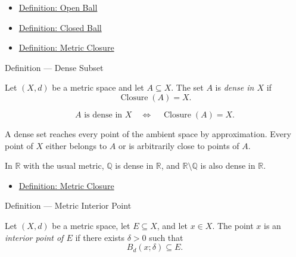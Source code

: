 \begin{dependencies}
\begin{itemize}
  \item \hyperref[def:metric-open-ball]{Definition: Open Ball}
  \item \hyperref[def:metric-closed-ball]{Definition: Closed Ball}
  \item \hyperref[def:metric-closure]{Definition: Metric Closure}
\end{itemize}
\end{dependencies}

\begin{definitionbox}{Definition --- Dense Subset}
\begin{definition}\label{def:metric-dense-subset}
Let \((X,d)\) be a metric space and let \(A\subseteq X\).  The set \(A\) is
\emph{dense in \(X\)} if
\[
  \operatorname{Closure}(A)=X.
\]
\end{definition}
\end{definitionbox}

\begin{remark*}
\[
A\text{ is dense in }X
\quad\Longleftrightarrow\quad
\operatorname{Closure}(A)=X.
\]
\end{remark*}

\begin{remark*}[Interpretation]
A dense set reaches every point of the ambient space by approximation.  Every
point of \(X\) either belongs to \(A\) or is arbitrarily close to points of
\(A\).
\end{remark*}

\begin{remark*}[Examples]
In \(\mathbb{R}\) with the usual metric, \(\mathbb{Q}\) is dense in
\(\mathbb{R}\), and \(\mathbb{R}\setminus\mathbb{Q}\) is also dense in
\(\mathbb{R}\).
\end{remark*}

\begin{dependencies}
\begin{itemize}
  \item \hyperref[def:metric-closure]{Definition: Metric Closure}
\end{itemize}
\end{dependencies}

\begin{definitionbox}{Definition --- Metric Interior Point}
\begin{definition}\label{def:metric-interior-point}
Let \((X,d)\) be a metric space, let \(E\subseteq X\), and let \(x\in X\).
The point \(x\) is an \emph{interior point of \(E\)} if there exists
\(\delta>0\) such that
\[
  B_d(x;\delta)\subseteq E.
\]
\end{definition}
\end{definitionbox}

